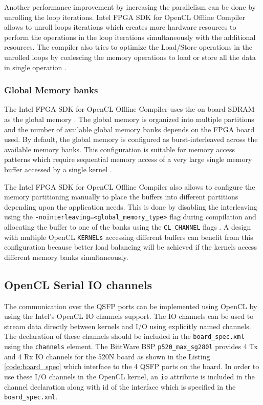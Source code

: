Another performance improvement by increasing the parallelism can be done
by unrolling the loop iterations. Intel FPGA SDK for OpenCL Offline Compiler
allows to unroll loops iterations which creates more hardware resources to perform
the operations in the loop iterations simultaneously with the additional resources.
The compiler also tries to optimize the Load/Store operations in the
unrolled loops by coalescing the memory operations to load or store
all the data in single operation \cite{noauthor_intel_2019_best, section 3.2}.

\subsubsection{Global Memory banks}

The Intel FPGA SDK for OpenCL Offline Compiler uses the on board SDRAM as the global memory
\cite{noauthor_intel_2019_best, chapter 7}. The global memory is organized into multiple
partitions and the number of available global memory banks depends on the
FPGA board used. By default, the global memory is configured as burst-interleaved
across the available memory banks. This configuration is suitable for memory
access patterns which require sequential memory access of a very large single memory
buffer accessed by a single kernel \cite{noauthor_intel_2019_best, section 7.2.1}.

The Intel FPGA SDK for OpenCL Offline Compiler also allows to configure the memory
partitioning manually to place the buffers into different partitions depending upon
the application needs. This is done by disabling the interleaving using the
\texttt{-nointerleaving=<global\_memory\_type>} flag during compilation and allocating the buffer to one of
the banks using the \texttt{CL\_CHANNEL} flags \cite{noauthor_intel_2019_prog, section 6.2.1}.
A design with multiple OpenCL \texttt{KERNELs} accessing different
buffers can benefit from this configuration because better load balancing will be achieved
if the kernels access different memory banks simultaneously.

\subsection{OpenCL Serial IO channels}

The communication over the QSFP ports can be implemented using OpenCL by using the
Intel's OpenCL IO channels support. The IO channels can be used to stream data
directly between kernels and I/O using explicitly named channels. The declaration
of these channels should be included in the \texttt{board\_spec.xml} using the
\texttt{channels} element. The BittWare BSP \texttt{p520\_max\_sg280l} provides
4 Tx and 4 Rx IO channels for the 520N board as shown in the Listing \ref{code:board_spec}
which interface to the 4 QSFP ports on the board.
In order to use these I/O channels in the OpenCL kernel,
an \texttt{io} attribute is included in the channel declaration along with id of
the interface which is specified in the \texttt{board\_spec.xml}.

